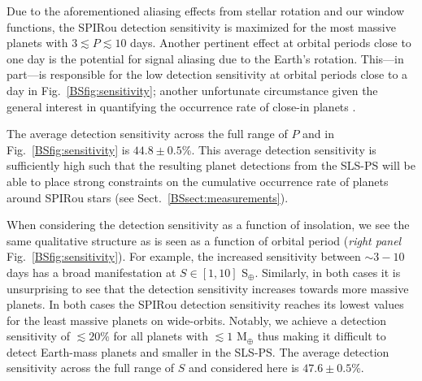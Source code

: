 Due to the
aforementioned aliasing effects from stellar rotation and our window functions, the SPIRou detection
sensitivity is maximized for the most massive planets with $3 \lesssim P \lesssim 10$ days. 
Another pertinent effect at orbital periods close to one day is the potential for signal aliasing due to the
Earth's rotation. This---in part---is responsible for the low detection sensitivity at orbital periods close
to a day in Fig.~\ref{BSfig:sensitivity}; another unfortunate circumstance given the general interest in
quantifying the occurrence rate of close-in planets \citep{mulders15}.

The average detection sensitivity across the full range of $P$ and
\msini{} in Fig.~\ref{BSfig:sensitivity} is $44.8 \pm 0.5$\%.
This average detection sensitivity is sufficiently high such that the
resulting planet detections from the SLS-PS will be able to place strong constraints on the cumulative
occurrence rate of planets around SPIRou stars (see Sect.~\ref{BSsect:measurements}).

When considering the detection sensitivity as a function of insolation, we see the same
qualitative structure as is seen as a function of orbital period (\emph{right panel}
Fig.~\ref{BSfig:sensitivity}). For example, the increased
sensitivity between $\sim 3-10$ days has a broad manifestation at $S \in [1,10]$ S$_{\oplus}$.
Similarly, in both cases it is unsurprising to see that the detection sensitivity increases
towards more massive planets. In both cases the SPIRou
detection sensitivity reaches its lowest values for the least massive planets on wide-orbits.
Notably, we achieve a detection sensitivity of $\lesssim 20$\% for all planets with
\msini{} $\lesssim 1$ M$_{\oplus}$ thus making it difficult to detect Earth-mass planets and
smaller in the SLS-PS. The average detection sensitivity across the full range of $S$ and
\msini{} considered here is $47.6 \pm 0.5$\%.


